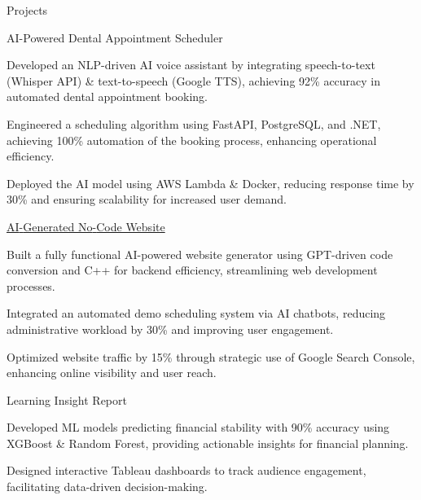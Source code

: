 \documentclass{resume} %
\begin{document}
    \begin{rSection}{Projects}
                    \begin{rSubsection}
                                    {AI{-}Powered Dental Appointment Scheduler}
                                {}{}{}
                                    \item Developed an NLP{-}driven AI voice assistant by integrating speech{-}to{-}text (Whisper API) \& text{-}to{-}speech (Google TTS), achieving 92\% accuracy in automated dental appointment booking.
                                    \item Engineered a scheduling algorithm using FastAPI, PostgreSQL, and .NET, achieving 100\% automation of the booking process, enhancing operational efficiency.
                                    \item Deployed the AI model using AWS Lambda \& Docker, reducing response time by 30\% and ensuring scalability for increased user demand.
                            \end{rSubsection}
                    \begin{rSubsection}
                                    {\href{www.civaroai.com}{AI{-}Generated No{-}Code Website}}
                                {}{}{}
                                    \item Built a fully functional AI{-}powered website generator using GPT{-}driven code conversion and C++ for backend efficiency, streamlining web development processes.
                                    \item Integrated an automated demo scheduling system via AI chatbots, reducing administrative workload by 30\% and improving user engagement.
                                    \item Optimized website traffic by 15\% through strategic use of Google Search Console, enhancing online visibility and user reach.
                            \end{rSubsection}
                    \begin{rSubsection}
                                    {Learning Insight Report}
                                {}{}{}
                                    \item Developed ML models predicting financial stability with 90\% accuracy using XGBoost \& Random Forest, providing actionable insights for financial planning.
                                    \item Designed interactive Tableau dashboards to track audience engagement, facilitating data{-}driven decision{-}making.

\end{rSubsection}
\end{rSection}
\end{document}

